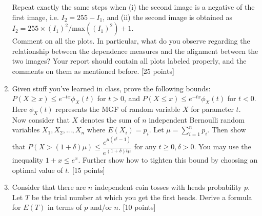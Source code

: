 \documentclass[11pt]{article}
\begin{document}
\begin{enumerate}
Repeat exactly the same steps when (i) the second image is a negative of the first image, i.e. $I_2 = 255 - I_1$, and (ii) the second image is obtained as $I_2 = 255 \times (I_1)^2/\text{max}((I_1)^2) + 1$. \\
Comment on all the plots. In particular, what do you observe regarding the relationship between the dependence measures and the alignment between the two images? Your report should contain all plots labeled properly, and the comments on them as mentioned before. \textsf{[25 points]}

\item Given stuff you've learned in class, prove the following bounds: $P(X \geq x) \leq e^{-tx} \phi_X(t)$ for $t > 0$, and $P(X \leq x) \leq e^{-tx} \phi_X(t)$ for $t < 0$. Here $\phi_X(t)$ represents the MGF of random variable $X$ for parameter $t$. \\
Now consider that $X$ denotes the sum of $n$ independent Bernoulli random variables $X_1, X_2,...,X_n$ where $E(X_i) = p_i$. Let $\mu = \sum_{i=1}^n p_i$. Then show that $P(X > (1+\delta)\mu) \leq \dfrac{e^{\mu(e^t-1)}}{e^{(1+\delta)t\mu}}$ for any $t \geq 0, \delta > 0$. You may use the inequality $1+x \leq e^x$. Further show how to tighten this bound by choosing an optimal value of $t$.
\textsf{[15 points]}

\item Consider that there are $n$ independent coin tosses with heads probability $p$. Let $T$ be the trial number at which you get the first heads. Derive a formula for $E(T)$ in terms of $p$ and/or $n$. \textsf{[10 points]}

\end{enumerate}
\end{document}
